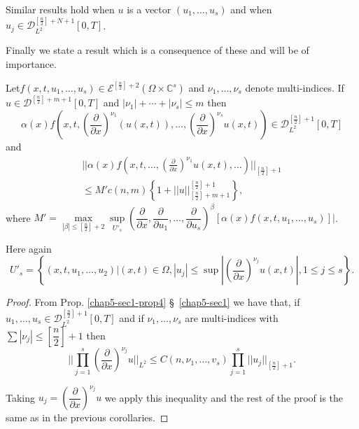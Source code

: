 Similar results hold when $u$ is a vector $(u_1, \ldots, u_s)$ and
when $u_j \in \mathscr{D}^{\left[\frac{n}{2}\right]+N+1}_{L^2} [ 0,
  T]$. 

Finally we state a result which is a consequence of these and will be
of importance. 

\begin{corollary}\label{chap5-sec2-coro4}%
Let\pageoriginale $f(x, t, u_1, \ldots, u_s ) \in
\mathscr{E}^{\left[\frac{n}{2}\right]+2} (\Omega \times \mathbb{C}^s)$
and $\nu_1, \ldots, \nu_s $ denote multi-indices. If $u
\in\mathscr{D}^{\left[\frac{n}{2}\right]+m+1}[0, T]$ and
$|\nu_1| + \cdots + |\nu_s| \leq m$ then  
$$
\alpha (x) f \left(x, t, \left(\dfrac{\partial}{\partial
  x}\right)^{\nu_1}  (u (x, t)), \ldots,
\left(\dfrac{\partial}{\partial x}\right)^{\nu_s} u(x, 
t)\right)\in \mathscr{D}^{\left[\frac{n}{2}\right]+1}_{L^2} [0, T] 
$$
and 
\begin{gather*}
|| \alpha (x) f\left(x, t, \ldots, \left(\frac{ \partial }{\partial
  x}\right)^{\nu_1} 
u (x, t ), \ldots \right)||_{\left[\frac{n}{2}\right] + 1}\\
 \leq M' c (n, m)\left\{ 1 +
|| u
||^{\left[\frac{n}{2}\right]+1}_{\left[\frac{n}{2}\right]+m+1}\right\},
\tag{2.13}\label{chap5-eq2.13}  
\end{gather*}
where $M' = \max\limits_{|\beta| \leq \left[\frac{n}{2}\right] + 2}
\sup\limits_{U'_s} \left(\dfrac{\partial }{\partial x},
\dfrac{\partial}{\partial u_1 }, \ldots, \dfrac{\partial }{\partial
  u_s}\right)^\beta [\alpha (x)f (x, t, u_1, \ldots, u_s)]|$. 

Here again  
\begin{equation*} 
U'_s = \left\{(x, t, u_1, \ldots, u_2) \bigg|(x, t) \in
\Omega, |u_j| \leq \sup | \left(\frac{\partial }{\partial
  x}\right)^{\nu_j} u (x, t)| , 1 \leq j \leq s \right
\}. \tag{2.14}\label{chap5-eq2.14}  
\end{equation*}
\end{corollary}

\begin{proof}
From Prop. \ref{chap5-sec1-prop4} \S\ \ref{chap5-sec1} we have that,
if $u_1, \ldots, u_s \in 
\mathscr{D}^{\left[\frac{n}{2}\right] + 1}_{L^2}[0, T]$ and if $
\nu_1, \ldots, \nu_s$  are multi-indices with $\sum |\nu_j| \leq \left[
  \dfrac{n}{2}\right]+ 1$ then   
\begin{equation*}
|| \prod\limits^s_{j = 1} \left(\frac{\partial}{\partial
  x}\right)^{\nu_j} u ||_{L^2} 
\leq C(n, \nu_1, \ldots, v_s) \prod\limits^{s}_{j=1}|| u_j
||_{\left[\frac{n}{2} \right]+1 } .\tag{2.15}\label{chap5-eq2.15}  
\end{equation*}

Taking $u_j = \left(\dfrac{ \partial}{\partial x}\right)^{\nu_j} u$ we
apply this inequality and the rest of the proof is the same as in the previous
corollaries.  
\end{proof}

